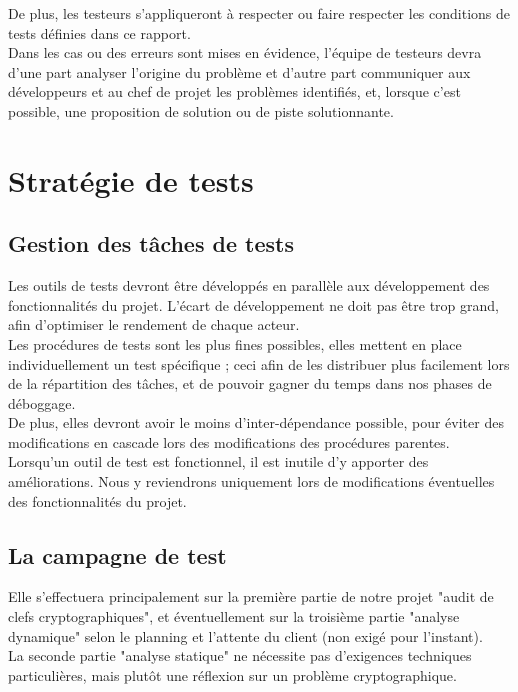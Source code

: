 \documentclass[a4paper,11pt,french]{article}
\begin{document}
De plus, les testeurs s'appliqueront à respecter ou faire respecter les conditions de tests définies dans ce rapport.\\

Dans les cas ou des erreurs sont mises en évidence, l'équipe de testeurs devra d'une part analyser l'origine du problème et d'autre part communiquer aux développeurs et au chef de projet les problèmes identifiés, et, lorsque c'est possible, une proposition de solution ou de piste solutionnante.


\section{Stratégie de tests}

\subsection{Gestion des tâches de tests}

Les outils de tests devront être développés en parallèle aux développement des fonctionnalités du projet. L'écart de développement ne doit pas être trop grand, afin d'optimiser le rendement de chaque acteur.\\

Les procédures de tests sont les plus fines possibles, elles mettent en place individuellement un test spécifique ; ceci afin de les distribuer plus facilement lors de la répartition des tâches, et de pouvoir gagner du temps dans nos phases de déboggage. \\

De plus, elles devront avoir le moins d'inter-dépendance possible, pour éviter des modifications en cascade lors des modifications des procédures parentes.
Lorsqu'un outil de test est fonctionnel, il est inutile d'y apporter des améliorations. Nous y reviendrons uniquement lors de modifications éventuelles des fonctionnalités du projet.

\subsection{La campagne de test}

Elle s'effectuera principalement sur la première partie de notre projet "audit de clefs cryptographiques", et éventuellement sur la troisième partie "analyse dynamique" selon le planning et l'attente du client (non exigé pour l'instant).\\

La seconde partie "analyse statique" ne nécessite pas d'exigences techniques particulières, mais plutôt une réflexion sur un problème cryptographique.
\end{document}
